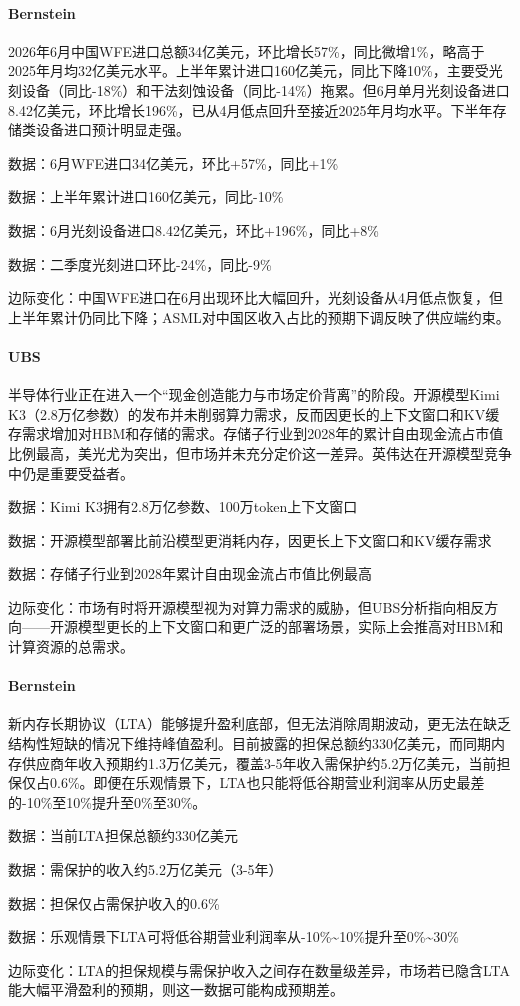 \documentclass[11pt]{ctexart}
\begin{document}
\paragraph{Bernstein} 2026年6月中国WFE进口总额34亿美元，环比增长57\%，同比微增1\%，略高于2025年月均32亿美元水平。上半年累计进口160亿美元，同比下降10\%，主要受光刻设备（同比-18\%）和干法刻蚀设备（同比-14\%）拖累。但6月单月光刻设备进口8.42亿美元，环比增长196\%，已从4月低点回升至接近2025年月均水平。下半年存储类设备进口预计明显走强。
{\small\color{refgray}数据：6月WFE进口34亿美元，环比+57\%，同比+1\%\par}
{\small\color{refgray}数据：上半年累计进口160亿美元，同比-10\%\par}
{\small\color{refgray}数据：6月光刻设备进口8.42亿美元，环比+196\%，同比+8\%\par}
{\small\color{refgray}数据：二季度光刻进口环比-24\%，同比-9\%\par}
{\small\color{refgray}边际变化：中国WFE进口在6月出现环比大幅回升，光刻设备从4月低点恢复，但上半年累计仍同比下降；ASML对中国区收入占比的预期下调反映了供应端约束。\par}
\paragraph{UBS} 半导体行业正在进入一个“现金创造能力与市场定价背离”的阶段。开源模型Kimi K3（2.8万亿参数）的发布并未削弱算力需求，反而因更长的上下文窗口和KV缓存需求增加对HBM和存储的需求。存储子行业到2028年的累计自由现金流占市值比例最高，美光尤为突出，但市场并未充分定价这一差异。英伟达在开源模型竞争中仍是重要受益者。
{\small\color{refgray}数据：Kimi K3拥有2.8万亿参数、100万token上下文窗口\par}
{\small\color{refgray}数据：开源模型部署比前沿模型更消耗内存，因更长上下文窗口和KV缓存需求\par}
{\small\color{refgray}数据：存储子行业到2028年累计自由现金流占市值比例最高\par}
{\small\color{refgray}边际变化：市场有时将开源模型视为对算力需求的威胁，但UBS分析指向相反方向——开源模型更长的上下文窗口和更广泛的部署场景，实际上会推高对HBM和计算资源的总需求。\par}
\paragraph{Bernstein} 新内存长期协议（LTA）能够提升盈利底部，但无法消除周期波动，更无法在缺乏结构性短缺的情况下维持峰值盈利。目前披露的担保总额约330亿美元，而同期内存供应商年收入预期约1.3万亿美元，覆盖3-5年收入需保护约5.2万亿美元，当前担保仅占0.6\%。即便在乐观情景下，LTA也只能将低谷期营业利润率从历史最差的-10\%至10\%提升至0\%至30\%。
{\small\color{refgray}数据：当前LTA担保总额约330亿美元\par}
{\small\color{refgray}数据：需保护的收入约5.2万亿美元（3-5年）\par}
{\small\color{refgray}数据：担保仅占需保护收入的0.6\%\par}
{\small\color{refgray}数据：乐观情景下LTA可将低谷期营业利润率从-10\%\textasciitilde{}10\%提升至0\%\textasciitilde{}30\%\par}
{\small\color{refgray}边际变化：LTA的担保规模与需保护收入之间存在数量级差异，市场若已隐含LTA能大幅平滑盈利的预期，则这一数据可能构成预期差。\par}
\end{document}

